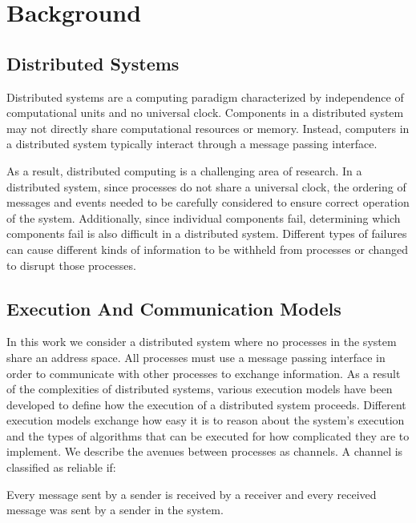\chapter{Background}

\section{Distributed Systems}

Distributed systems are a computing paradigm characterized by independence of computational units and no universal clock.
Components in a distributed system may not directly share computational resources or memory.
Instead, computers in a distributed system typically interact through a message passing interface.

As a result, distributed computing is a challenging area of research.
In a distributed system, since processes do not share a universal clock, the ordering of messages and events needed to be carefully considered to ensure correct operation of the system.
Additionally, since individual components fail, determining which components fail is also difficult in a distributed system.
Different types of failures can cause different kinds of information to be withheld from processes or changed to disrupt those processes.

\section{Execution And Communication Models}

In this work we consider a distributed system where no processes in the system share an address space.
All processes must use a message passing interface in order to communicate with other processes to exchange information.
As a result of the complexities of distributed systems, various execution models have been developed to define how the execution of a distributed system proceeds.
Different execution models exchange how easy it is to reason about the system's execution and the types of algorithms that can be executed for how complicated they are to implement.
We describe the avenues between processes as channels.
A channel is classified as reliable if:

\begin{axm}
    \label{axm:reliable-channel-sender}
    Every message sent by a sender is received by a receiver and every received message was sent by a sender in the system. \cite{DISTRIBUTED}
\end{axm}


